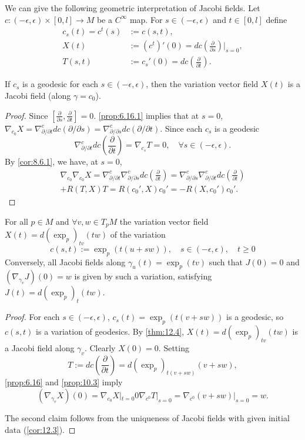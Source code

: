 We can give the following geometric interpretation of Jacobi fields.
Let $c : (-\epsilon, \epsilon) \times [0,l] \to M$ be a $C^{\infty}$ map.
For $s \in (-\epsilon, \epsilon)$ and $t \in [0,l]$ define
\[
\begin{aligned}
c_s(t) = c^t(s) &:= c(s,t), \\
X(t) &:= (c^t)'(0) = dc\left(\frac{\partial }{\partial s}\right)\Big|_{s=0}, \\
T(s,t) &:= c_s'(0) = dc\left(\frac{\partial }{\partial t}\right).
\end{aligned}
\]

\begin{theorem}\label{thm:12.4}
If $c_s$ is a geodesic for each $s \in (-\epsilon, \epsilon)$, then the variation vector field $X(t)$ 
is a Jacobi field (along $\gamma = c_0$).
\end{theorem}

\begin{proof}
Since $\left[\frac{\partial}{\partial s},\frac{\partial}{\partial t}\right] = 0$.
\autoref{prop:6.16.1} implies that at $s=0$, $\nabla_{c_0}X = \nabla_{\partial/\partial t}^cdc(\partial/\partial s) = \nabla_{\partial/\partial s}^cdc(\partial/\partial t)$.
Since each $c_s$ is a geodesic
\[
\nabla_{\partial/\partial t}^cdc\left(\frac{\partial}{\partial t}\right) = \nabla_{c_s}T = 0, \quad \forall s \in (-\epsilon, \epsilon).
\]
By \autoref{cor:8.6.1}, we have, at $s=0$,  
\[
\begin{aligned}
\nabla_{c_0}\nabla_{c_0}X = \nabla_{\partial/\partial t}^c\nabla_{\partial /\partial s}^cdc\left(\frac{\partial}{\partial t}\right) = \nabla_{\partial/\partial s}^c\nabla_{\partial / \partial t}^cdc\left(\frac{\partial}{\partial t}\right) \\
+R(T,X)T = R(c_0', X)c_0' = -R(X, c_0') c_0'.
\end{aligned}
\]
\end{proof}

\begin{corollary}\label{cor:12.5}
For all $p \in M$ and $\forall v, w \in T_pM$ the variation vector field
$X(t) = d(\exp_p)_{tv}(tw)$ of the variation
\[
c(s,t) := \exp_p(t(u + sw)), \quad s\in (-\epsilon, \epsilon), \quad t\geq 0
\]
Conversely, all Jacobi fields along $\gamma_u(t) = \exp_p(tv)$ such that 
$J(0) = 0$ and $(\nabla_{\gamma_v}J)(0) = w$ is given by such a variation, satisfying
$J(t) = d(\exp_p)_{t}(tw)$.
\end{corollary}

\begin{proof}
For each $s\in (-\epsilon, \epsilon)$, $c_s(t) = \exp_p(t(v + sw))$ is
a geodesic, so $c(s,t)$ is a variation of geodesics.
By \autoref{thm:12.4}, $X(t) = d(\exp_p)_{tv}(tw)$ is a Jacobi field along $\gamma_v$.
Clearly $X(0) = 0$. Setting
\[
T := dc\left(\frac{\partial}{\partial t}\right) = d(\exp_p)_{t(v + sw)}(v + sw),
\]
\autoref{prop:6.16} and \autoref{prop:10.3} imply
\[
(\nabla_{\gamma_v}X)(0) = \nabla_{c_0}X|_{t=0} 0 \nabla_{c^0}T|_{s=0} = \nabla_{c^0}(v + sw)|_{s=0} = w.
\]

The second claim follows from the uniqueness of Jacobi fields with given
initial data (\autoref{cor:12.3}).
\end{proof}


